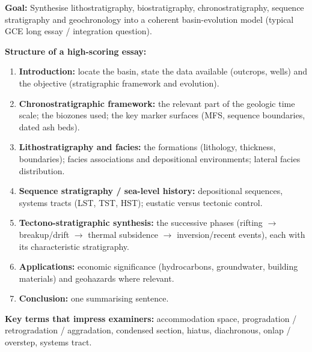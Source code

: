 \documentclass[11pt]{article}
\newcommand{\cle}[1]{{\popxbold\color{popdark}#1}}
\begin{document}
\begin{methode}
\textbf{Goal:} Synthesise lithostratigraphy, biostratigraphy, chronostratigraphy, sequence stratigraphy and geochronology into a coherent basin-evolution model (typical GCE long essay / integration question).

\textbf{Structure of a high-scoring essay:}
\begin{enumerate}
    \item \textbf{Introduction:} locate the basin, state the data available (outcrops, wells) and the objective (stratigraphic framework and evolution).
    \item \textbf{Chronostratigraphic framework:} the relevant part of the geologic time scale; the biozones used; the key marker surfaces (MFS, sequence boundaries, dated ash beds).
    \item \textbf{Lithostratigraphy and facies:} the formations (lithology, thickness, boundaries); facies associations and depositional environments; lateral facies distribution.
    \item \textbf{Sequence stratigraphy / sea-level history:} depositional sequences, systems tracts (LST, TST, HST); eustatic versus tectonic control.
    \item \textbf{Tectono-stratigraphic synthesis:} the successive phases (rifting $\rightarrow$ breakup/drift $\rightarrow$ thermal subsidence $\rightarrow$ inversion/recent events), each with its characteristic stratigraphy.
    \item \textbf{Applications:} economic significance (hydrocarbons, groundwater, building materials) and geohazards where relevant.
    \item \textbf{Conclusion:} one summarising sentence.
\end{enumerate}

\textbf{Key terms that impress examiners:} \cle{accommodation space}, \cle{progradation / retrogradation / aggradation}, \cle{condensed section}, \cle{hiatus}, \cle{diachronous}, \cle{onlap / overstep}, \cle{systems tract}.
\end{methode}
\end{document}
